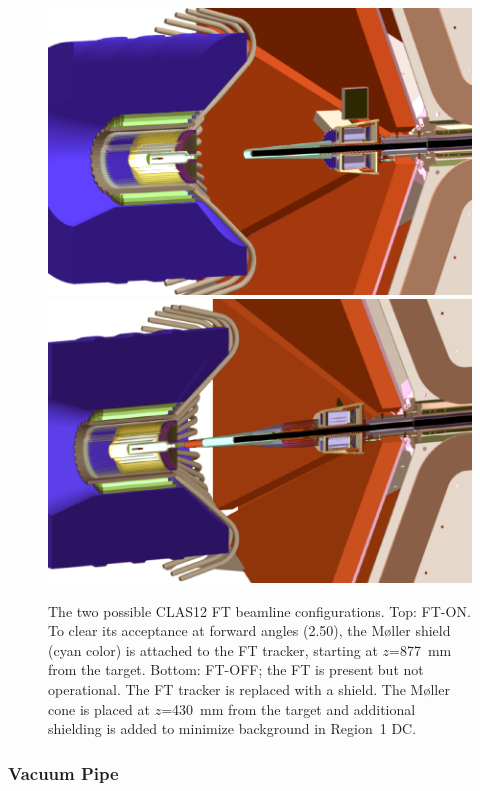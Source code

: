 \begin{figure}
	\centering
	\includegraphics[width=0.99\columnwidth,keepaspectratio]{img/ftOnGeometry.png}
	\includegraphics[width=0.99\columnwidth,keepaspectratio]{img/ftOffGeometry.png}
	\caption{The two possible CLAS12 FT beamline configurations. Top: FT-ON. To clear its acceptance at forward angles
          (2.50\mdeg), the M\o ller shield (cyan color) is attached to the FT tracker, starting at $z$=877~mm
          from the target. Bottom: FT-OFF; the FT is present but not operational. The FT tracker is replaced with a shield.
          The M\o ller cone is placed at $z$=430~mm from the target and additional shielding is added to minimize
          background in Region~1 DC.}
	\label{fig:beamlineGeometry}
\end{figure}

\subsubsection{Vacuum Pipe}

